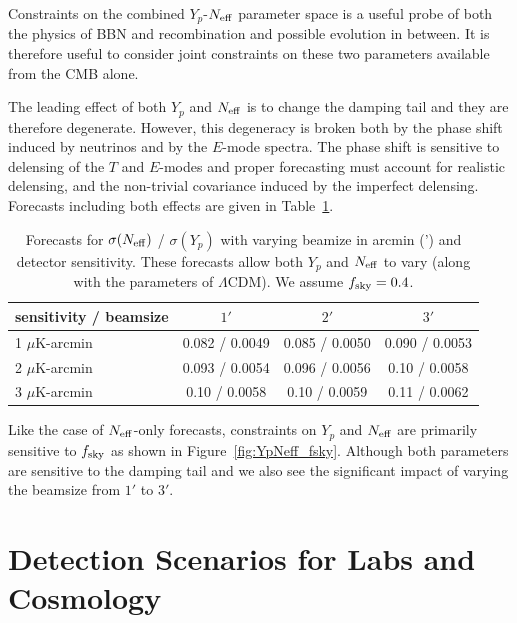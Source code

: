 Constraints on the combined $Y_p$-$N_{\rm eff}$ parameter space is a useful probe of both the physics of BBN and recombination and possible evolution in between.  It is therefore useful to consider joint constraints on these two parameters available from the CMB alone.  

The leading effect of both $Y_p$ and $N_{\rm eff}$ is to change the damping tail and they are therefore degenerate.  However, this degeneracy is broken both by the phase shift induced by neutrinos and by the $E$-mode spectra.  The phase shift is sensitive to delensing of the $T$ and $E$-modes and proper forecasting must account for realistic delensing, and the non-trivial covariance induced by the imperfect delensing.  Forecasts including both effects are given in Table~\ref{tab:YpNeffbeam}.

 

\begin{table}[t!]
\begin{center}
\begin{tabular}{l ccc} 
 \toprule
    		sensitivity / beamsize		    			& $1'$  		& $2'$  		& $3'$  		 \\ [0.5ex]
 \midrule
   1 $\mu$K-arcmin & 0.082 / 0.0049		& 0.085 /  0.0050 		& 0.090 / 0.0053		 		  \\
  2  $\mu$K-arcmin & 0.093 / 0.0054		& 0.096 / 0.0056		& 0.10 / 0.0058	 		  \\
   3  $\mu$K-arcmin & 0.10 / 0.0058		& 0.10 / 0.0059		& 0.11 / 0.0062		 		  \\
    \bottomrule
\end{tabular}
\caption{Forecasts for $\sigma(N_{\rm eff})$ / $\sigma(Y_p)$ with varying beamize in arcmin (') and detector sensitivity. These forecasts allow both $Y_p$ and $N_{\rm eff}$ to vary (along with the parameters of $\Lambda$CDM).  We assume $f_{\rm sky} = 0.4$. }
\label{tab:YpNeffbeam}
\end{center}
\end{table}

Like the case of $N_{\rm eff}$-only forecasts, constraints on $Y_p$ and $N_{\rm eff}$ are primarily sensitive to $f_{\rm sky}$ as shown in Figure~\ref{fig:YpNeff_fsky}.  Although both parameters are sensitive to the damping tail and we also see the significant impact of varying the beamsize from $1'$ to $3'$.  




\section{Detection Scenarios for Labs and Cosmology}~\label{sec:neffscenarios}

